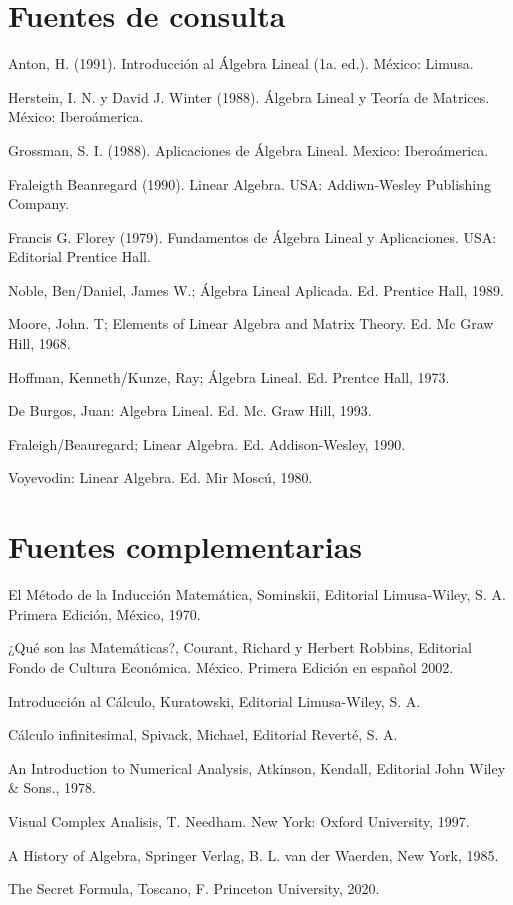 \section*{Fuentes de consulta}

\begin{enumerate}[resume,label={[\arabic*]}]
    \item Anton, H. (1991). Introducción al Álgebra Lineal (1a. ed.). México: Limusa.
    \item Herstein, I. N. y David J. Winter (1988). Álgebra Lineal y Teoría de Matrices. México: Iberoámerica.
    \item Grossman, S. I. (1988). Aplicaciones de Álgebra Lineal. Mexico: Iberoámerica.
    \item Fraleigth Beanregard (1990). Linear Algebra. USA: Addiwn-Wesley Publishing Company.
    \item Francis G. Florey (1979). Fundamentos de Álgebra Lineal y Aplicaciones. USA: Editorial Prentice Hall.
    \item Noble, Ben/Daniel, James W.; Álgebra Lineal Aplicada. Ed. Prentice Hall, 1989.
    \item Moore, John. T; Elements of Linear Algebra and Matrix Theory. Ed. Mc Graw Hill, 1968.
    \item Hoffman, Kenneth/Kunze, Ray; Álgebra Lineal. Ed. Prentce Hall, 1973.
    \item De Burgos, Juan: Algebra Lineal. Ed. Mc. Graw Hill, 1993.
    \item Fraleigh/Beauregard; Linear Algebra. Ed. Addison-Wesley, 1990.
    \item Voyevodin: Linear Algebra. Ed. Mir Moscú, 1980.
\end{enumerate}

\section*{Fuentes complementarias}

\begin{enumerate}[resume,label={[\arabic*]}]
    \item El Método de la Inducción Matemática, Sominskii, Editorial Limusa-Wiley, S. A. Primera Edición, México, 1970.
    \item ¿Qué son las Matemáticas?, Courant, Richard y Herbert Robbins, Editorial Fondo de Cultura Económica. México. Primera Edición en español 2002.
    \item Introducción al Cálculo, Kuratowski, Editorial Limusa-Wiley, S. A.
    \item Cálculo infinitesimal, Spivack, Michael, Editorial Reverté, S. A.
    \item An Introduction to Numerical Analysis, Atkinson, Kendall, Editorial John Wiley \& Sons., 1978.
    \item Visual Complex Analisis, T. Needham. New York: Oxford University, 1997.
    \item A History of Algebra, Springer Verlag, B. L. van der Waerden, New York, 1985.
    \item The Secret Formula, Toscano, F. Princeton University, 2020.
\end{enumerate}